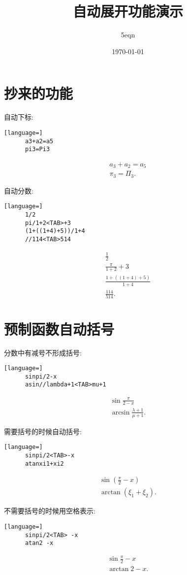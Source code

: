 \documentclass[UTF8,a4paper,11pt]{ctexart}
\title{自动展开功能演示}
\author{5eqn}
\date{\today}
\begin{document}
  \maketitle
  \section{抄来的功能}
    自动下标:
    \begin{lstlisting}[language=] 
      a3+a2=a5
      pi3=Pi3\end{lstlisting}
    \[
    \begin{aligned}
      a_3+a_2=a_5
      \\\pi_3=\Pi_3
    .\end{aligned}
    \]
    
    自动分数:
    \begin{lstlisting}[language=] 
      1/2
      pi/1+2<TAB>+3
      (1+((1+4)+5))/1+4
      //114<TAB>514\end{lstlisting}
    \[
    \begin{aligned}
      \frac{1}{2}
      \\\frac{\pi}{1+2}+3
      \\\frac{1+((1+4)+5)}{1+4}
      \\\frac{114}{514}
    .\end{aligned}
    \]
    
  \section{预制函数自动括号}
    分数中有减号不形成括号: 
    \begin{lstlisting}[language=]
      sinpi/2-x
      asin//lambda+1<TAB>mu+1\end{lstlisting}
    \[
    \begin{aligned}
      \sin \frac{\pi}{2-x}
      \\ \arcsin \frac{\lambda+1}{\mu+1}
    .\end{aligned}
    \]

    需要括号的时候自动括号: 
    \begin{lstlisting}[language=] 
      sinpi/2<TAB>-x
      atanxi1+xi2\end{lstlisting}
    \[
    \begin{aligned}
      \sin\left(\frac{\pi}{2}-x\right)
      \\ \arctan \left(\xi_1+\xi_2\right)
    .\end{aligned}
    \]

    不需要括号的时候用空格表示: 
    \begin{lstlisting}[language=] 
      sinpi/2<TAB> -x
      atan2 -x\end{lstlisting}
    \[
    \begin{aligned}
      \sin \frac{\pi}{2} -x
      \\ \arctan 2 -x
    .\end{aligned}
    \]
    
\end{document}

